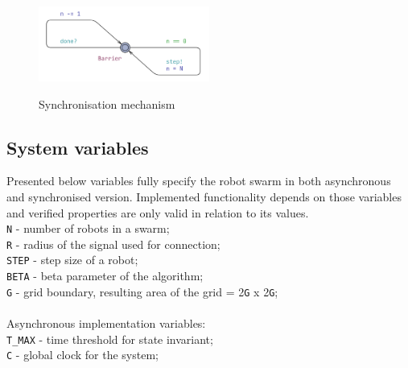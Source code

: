 \begin{figure}[H]
\caption{Synchronisation mechanism}
\centering
\includegraphics[width=0.5\textwidth]{images/implementation_synchronised_barrier.png}
\label{fig:implementation_synchronised_barrier}
\end{figure}



\subsection{System variables}
Presented below variables fully specify the robot swarm in both asynchronous and synchronised version. Implemented functionality depends on those variables and verified properties are only valid in relation to its values.\\
\texttt{N} - number of robots in a swarm;\\
\texttt{R} - radius of the signal used for connection;\\
\texttt{STEP} - step size of a robot;\\
\texttt{BETA} - beta parameter of the algorithm;\\
\texttt{G} - grid boundary, resulting area of the grid = 2\texttt{G} x 2\texttt{G};\\\\
Asynchronous implementation variables:\\
\texttt{T\_MAX} - time threshold for state invariant;\\
\texttt{C} - global clock for the system;



